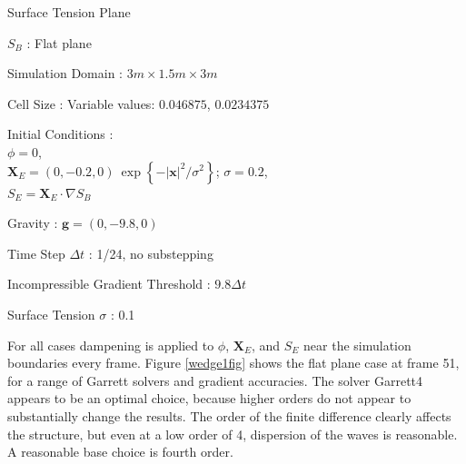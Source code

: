 \documentclass{article}
\def\xvec{\textbf{x}}
\def\gvec{\textbf{g}}
\def\Xvec{\textbf{X}}
\def\dt{\Delta t}
\begin{document}
\begin{description}
\item{Surface Tension Plane} 
   \begin{description}
   \item{$S_B$ :}  Flat plane
   \item{Simulation Domain :}  $3 m\times 1.5 m\times 3 m$
   \item{Cell Size :} Variable values: $0.046875$, $0.0234375$
   \item{Initial Conditions :} \\ $\phi = 0$,\\ $\Xvec_E = (0, -0.2, 0)\ \exp\left\{ -|\xvec|^2/\sigma^2  \right\}$; $\sigma=0.2$, \\ $S_E = \Xvec_E\cdot\nabla S_B$
   \item{Gravity :} $\gvec = (0,-9.8,0)$
   \item{Time Step $\dt$ :} 1/24, no substepping
   \item{Incompressible Gradient Threshold :} $9.8\dt$
   \item{Surface Tension $\sigma$ :} 0.1
   \end{description}


\end{description}
For all cases dampening is applied to $\phi$, $\Xvec_E$, and $S_E$ near the simulation boundaries every frame.  Figure \ref{wedge1fig} shows the flat plane case at frame 51, for a range of Garrett solvers and gradient accuracies. The solver Garrett4 appears to be an optimal choice, because higher orders do not appear to substantially change the results. The order of the finite difference clearly affects the structure, but even at a low order of 4, dispersion of the waves is reasonable. A reasonable base choice is fourth order. 
\end{document}
